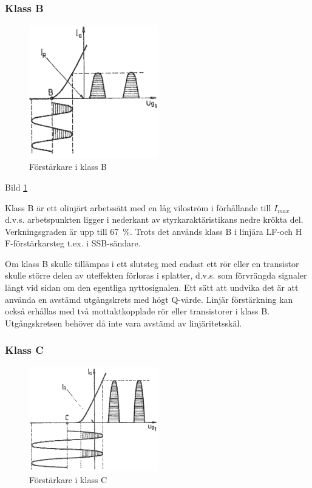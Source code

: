 \subsubsection{Klass B}

\begin{figure}
\includegraphics[width=0.5\textwidth]{images/cropped_pdfs/bild_2_3-45.pdf}
\caption{Förstärkare i klass B}
\label{fig:BildII3-45}
\end{figure}

Bild \ref{fig:BildII3-45}

Klass B är ett olinjärt arbetssätt med en låg viloström i förhållande
till \(I_{max}\) d.v.s. arbetspunkten ligger i nederkant av
styrkaraktäristikans nedre krökta del. Verkningsgraden är upp till
67~\%. Trots det används klass B i linjära LF-och H F-förstärkarsteg
t.ex. i SSB-sändare.

Om klass B skulle tillämpas i ett slutsteg med endast ett rör eller en
transistor skulle större delen av uteffekten förloras i splatter,
d.v.s. som förvrängda signaler långt vid sidan om den egentliga
nyttosignalen. Ett sätt att undvika det är att använda en avstämd
utgångskrets med högt Q-värde. Linjär förstärkning kan också erhållas
med två mottaktkopplade rör eller transistorer i klass B.
Utgångskretsen behöver då inte vara avstämd av linjäritetsskäl.

\subsubsection{Klass C}

\begin{figure}
\includegraphics[width=0.5\textwidth]{images/cropped_pdfs/bild_2_3-46.pdf}
\caption{Förstärkare i klass C}
\label{fig:BildII3-46}
\end{figure}

